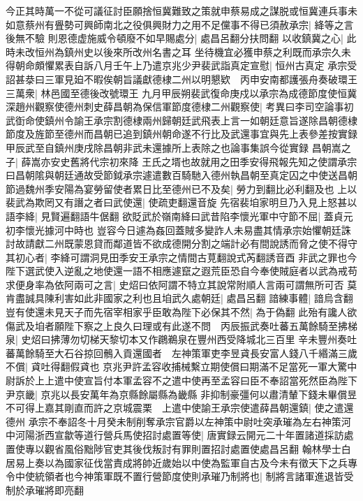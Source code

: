 今正其時萬一不從可議征討臣願捨恒冀難致之策就申蔡易成之謀脱或恒冀連兵事未如意蔡州有舋勢可興師南北之役俱興財力之用不足儻事不得已須赦承宗|{
	絳等之言後無不驗}
則恩德虚施威令頓廢不如早賜處分|{
	處昌呂翻分扶問翻}
以收鎮冀之心|{
	此時未改恒州為鎮州史以後來所改州名書之耳}
坐待機宜必獲申蔡之利既而承宗久未得朝命頗懼累表自訴八月壬午上乃遣京兆少尹裴武詣真定宣慰|{
	恒州古真定}
承宗受詔甚㳟曰三軍見廹不暇俟朝旨議獻德棣二州以明懇欵　丙申安南都護張舟奏破環王三萬衆|{
	林邑國至德後改號環王}
九月甲辰朔裴武復命庚戍以承宗為成德節度使恒冀深趙州觀察使德州刺史薛昌朝為保信軍節度德棣二州觀察使|{
	考異曰李司空論事初武衘命使鎮州令諭王承宗割德棣兩州歸朝廷武飛表上言一如朝廷意旨遂除昌朝德棣節度及旌節至德州而昌朝已追到鎮州朝命遂不行比及武還事宜與先上表參差按實録甲辰武至自鎮州庚戌除昌朝非武未還據所上表除之也論事集誤今從實録}
昌朝嵩之子|{
	薛嵩亦安史舊將代宗初來降}
王氏之壻也故就用之田季安得飛報先知之使謂承宗曰昌朝隂與朝廷通故受節鉞承宗遽遣數百騎馳入德州執昌朝至真定囚之中使送昌朝節過魏州季安陽為宴勞留使者累日比至德州已不及矣|{
	勞力到翻比必利翻及也}
上以裴武為欺罔又有譖之者曰武使還|{
	使疏吏翻還音旋}
先宿裴垍家明旦乃入見上怒甚以語李絳|{
	見賢遍翻語牛倨翻}
欲貶武於嶺南絳曰武昔陷李懷光軍中守節不屈|{
	蓋貞元初李懷光據河中時也}
豈容今日遽為姦回蓋賊多變詐人未易盡其情承宗始懼朝廷誅討故請獻二州既蒙恩貸而鄰道皆不欲成德開分割之端計必有間說誘而脅之使不得守其初心者|{
	李絳可謂洞見田季安王承宗之情間古莧翻說式芮翻誘音酉}
非武之罪也今陛下選武使入逆亂之地使還一語不相應遽竄之遐荒臣恐自今奉使賊庭者以武為戒苟求便身率為依阿兩可之言|{
	史炤曰依阿謂不特立其說常附順人言兩可謂無所可否}
莫肯盡誠具陳利害如此非國家之利也且垍武久處朝廷|{
	處昌呂翻}
諳練事體|{
	諳烏含翻}
豈有使還未見天子而先宿宰相家乎臣敢為陛下必保其不然|{
	為于偽翻}
此殆有讒人欲傷武及垍者願陛下察之上良久曰理或有此遂不問　丙辰振武奏吐蕃五萬餘騎至拂梯泉|{
	史炤曰拂薄勿切梯天黎切本又作鸊鵜泉在豐州西受降城北三百里}
辛未豐州奏吐蕃萬餘騎至大石谷掠回鶻入貢還國者　左神策軍吏李昱貣長安富人錢八千緡滿三歲不償|{
	貣吐得翻假貣也}
京兆尹許孟容收捕械繫立期使償曰期滿不足當死一軍大驚中尉訴於上上遣中使宣旨付本軍孟容不之遣中使再至孟容曰臣不奉詔當死然臣為陛下尹京畿|{
	京兆以長安萬年為京縣餘屬縣為畿縣}
非抑制豪彊何以肅清輦下錢未畢償昱不可得上嘉其剛直而許之京城震栗　上遣中使諭王承宗使遣薛昌朝還鎮|{
	使之遣還德州}
承宗不奉詔冬十月癸未制削奪承宗官爵以左神策中尉吐突承璀為左右神策河中河陽浙西宣歙等道行營兵馬使招討處置等使|{
	唐實録云開元二十年置諸道採訪處置使專以觀省風俗黜陟官吏其後伐叛討有罪則置招討處置使處昌呂翻}
翰林學士白居易上奏以為國家征伐當責成將帥近歲始以中使為監軍自古及今未有徵天下之兵專令中使統領者也今神策軍既不置行營節度使則承璀乃制將也|{
	制將言諸軍進退皆受制於承璀將即亮翻}
